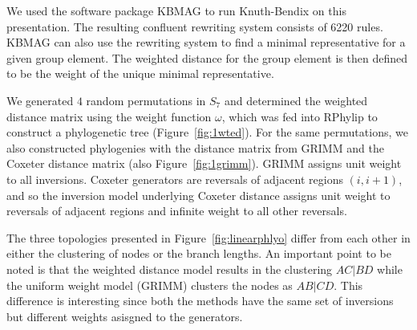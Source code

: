 \documentclass[12pt,a4paper]{amsart}
\numberwithin{equation}{section}
\begin{document}
We used the software package KBMAG \citep{holtkbmag} to run Knuth-Bendix on this presentation. The resulting confluent rewriting system consists of 6220 rules. KBMAG can also use the rewriting system to find a minimal representative for a given group element.  The weighted distance for the group element is then defined to be the weight of the unique minimal representative.

We generated $4$ random permutations in $S_7$ and determined the weighted distance matrix using the weight function $\omega$, which was fed into RPhylip \citep{revell2014rphylip,felsenstein1993phylip} to construct a phylogenetic tree (Figure~\ref{fig:1wted}). For the same permutations, we also constructed phylogenies with the distance matrix from GRIMM \citep{tesler2002grimm} and the Coxeter distance matrix (also Figure~\ref{fig:1grimm}). GRIMM assigns unit weight to all inversions. Coxeter generators are reversals of adjacent regions $(i, i+1)$, and so the inversion model underlying Coxeter distance assigns unit weight to reversals of adjacent regions and infinite weight to all other reversals.

The three topologies presented in Figure~\ref{fig:linearphlyo} differ from each other in either the clustering of nodes or the branch lengths. An important point to be noted is that the weighted distance model results in the clustering $AC|BD$ while the uniform weight model (GRIMM) clusters the nodes as $AB|CD$. This difference is interesting since both the methods have the same set of inversions but different weights asisgned to the generators.
\end{document}
